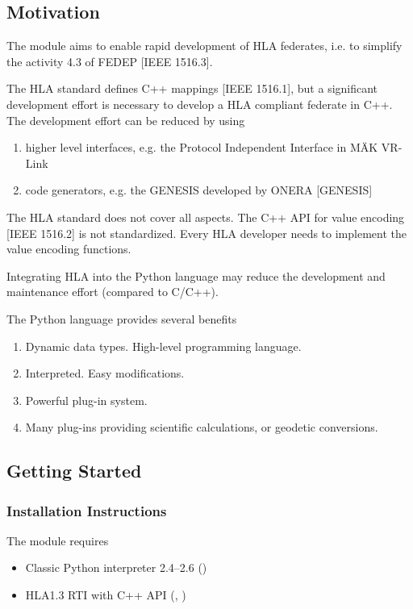 \documentclass[12pt,a4paper]{howto}
\begin{document}
\subsection{Motivation}

The  module aims to enable rapid development of HLA federates,
i.e. to simplify the activity 4.3 of FEDEP [IEEE 1516.3].

The HLA standard defines C++ mappings [IEEE 1516.1], but a significant
development effort is necessary to develop a HLA compliant federate in C++.
The development effort can be reduced by using
\begin{enumerate}
\item higher level interfaces, e.g. the Protocol Independent Interface in M\"{A}K VR-Link
\item code generators, e.g. the GENESIS developed by ONERA [GENESIS]
\end{enumerate}

The HLA standard does not cover all aspects.
The C++ API for value encoding [IEEE 1516.2] is not standardized. Every HLA
developer needs to implement the value encoding functions.

Integrating HLA into the Python language may reduce the development and
maintenance effort (compared to C/C++).

The Python language provides several benefits
\begin{enumerate}
\item Dynamic data types. High-level programming language.
\item Interpreted. Easy modifications.
\item Powerful plug-in system.
\item Many plug-ins providing scientific calculations, or geodetic conversions.
\end{enumerate}

\subsection{Getting Started}

\subsubsection{Installation Instructions}

The  module requires
\begin{itemize}
\item Classic Python interpreter 2.4--2.6 ()
\item HLA1.3 RTI with C++ API (, )
\end{itemize}
\end{document}
